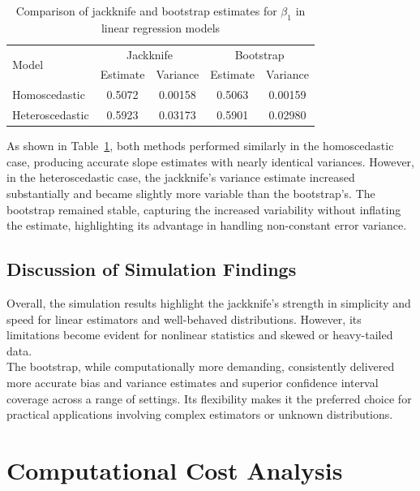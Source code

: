 \documentclass{article}
\begin{document}
\begin{table}[h!]
\centering
\caption{Comparison of jackknife and bootstrap estimates for \(\beta_1\) in linear regression models}
\begin{tabular}{|l|c|c|c|c|}
\hline
\multirow{2}{*}{Model} & \multicolumn{2}{c|}{Jackknife} & \multicolumn{2}{c|}{Bootstrap} \\
\cline{2-5}
& Estimate & Variance & Estimate & Variance \\
\hline
Homoscedastic   & 0.5072 & 0.00158 & 0.5063 & 0.00159 \\
Heteroscedastic & 0.5923 & 0.03173 & 0.5901 & 0.02980 \\
\hline
\end{tabular}
\label{tab:regression-est}
\end{table}

As shown in Table~\ref{tab:regression-est}, both methods performed similarly in the homoscedastic case, producing accurate slope estimates with nearly identical variances. However, in the heteroscedastic case, the jackknife's variance estimate increased substantially and became slightly more variable than the bootstrap’s. The bootstrap remained stable, capturing the increased variability without inflating the estimate, highlighting its advantage in handling non-constant error variance.


\subsection{Discussion of Simulation Findings}

Overall, the simulation results highlight the jackknife's strength in simplicity and speed for linear estimators and well-behaved distributions. However, its limitations become evident for nonlinear statistics and skewed or heavy-tailed data.\\

The bootstrap, while computationally more demanding, consistently delivered more accurate bias and variance estimates and superior confidence interval coverage across a range of settings. Its flexibility makes it the preferred choice for practical applications involving complex estimators or unknown distributions.\\

\section{Computational Cost Analysis}
\end{document}
